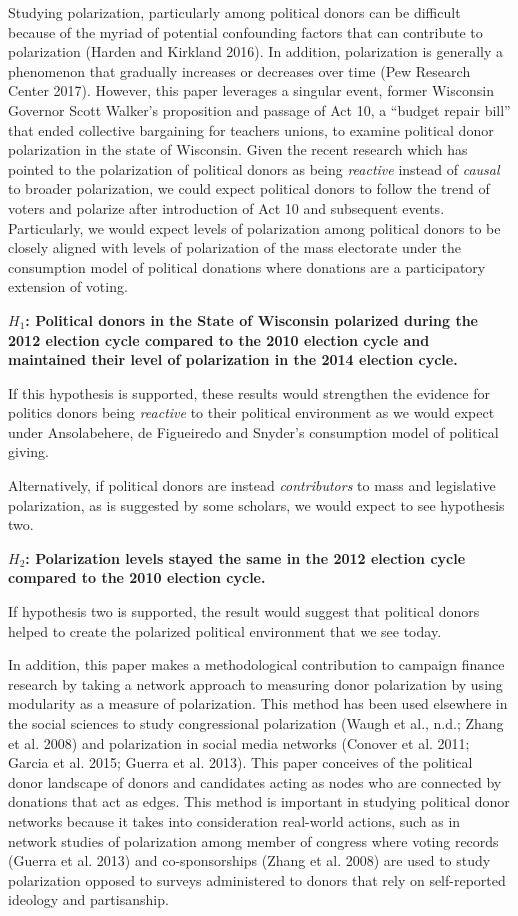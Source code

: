 \documentclass[12pt,]{article}
\begin{document}
Studying polarization, particularly among political donors can be
difficult because of the myriad of potential confounding factors that
can contribute to polarization (Harden and Kirkland 2016). In addition,
polarization is generally a phenomenon that gradually increases or
decreases over time (Pew Research Center 2017). However, this paper
leverages a singular event, former Wisconsin Governor Scott Walker's
proposition and passage of Act 10, a ``budget repair bill'' that ended
collective bargaining for teachers unions, to examine political donor
polarization in the state of Wisconsin. Given the recent research which
has pointed to the polarization of political donors as being
\emph{reactive} instead of \emph{causal} to broader polarization, we
could expect political donors to follow the trend of voters and polarize
after introduction of Act 10 and subsequent events. Particularly, we
would expect levels of polarization among political donors to be closely
aligned with levels of polarization of the mass electorate under the
consumption model of political donations where donations are a
participatory extension of voting.

\textbf{\(H_{1}\): Political donors in the State of Wisconsin polarized
during the 2012 election cycle compared to the 2010 election cycle and
maintained their level of polarization in the 2014 election cycle.}

If this hypothesis is supported, these results would strengthen the
evidence for politics donors being \emph{reactive} to their political
environment as we would expect under Ansolabehere, de Figueiredo and
Snyder's consumption model of political giving.

Alternatively, if political donors are instead \emph{contributors} to
mass and legislative polarization, as is suggested by some scholars, we
would expect to see hypothesis two.

\textbf{\(H_{2}\): Polarization levels stayed the same in the 2012
election cycle compared to the 2010 election cycle.}

If hypothesis two is supported, the result would suggest that political
donors helped to create the polarized political environment that we see
today.

In addition, this paper makes a methodological contribution to campaign
finance research by taking a network approach to measuring donor
polarization by using modularity as a measure of polarization. This
method has been used elsewhere in the social sciences to study
congressional polarization (Waugh et al., n.d.; Zhang et al. 2008) and
polarization in social media networks (Conover et al. 2011; Garcia et
al. 2015; Guerra et al. 2013). This paper conceives of the political
donor landscape of donors and candidates acting as nodes who are
connected by donations that act as edges. This method is important in
studying political donor networks because it takes into consideration
real-world actions, such as in network studies of polarization among
member of congress where voting records (Guerra et al. 2013) and
co-sponsorships (Zhang et al. 2008) are used to study polarization
opposed to surveys administered to donors that rely on self-reported
ideology and partisanship.
\end{document}
